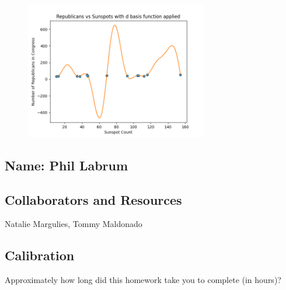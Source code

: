 \documentclass[submit]{harvardml}
\begin{document}
\begin{enumerate}
\begin{enumerate}
\begin{figure}[H]
            \includegraphics[width=8cm]{hw1/T1P4_plots/plot7.png}
            \centering
        \end{figure}
    \end{enumerate}

\end{enumerate}

\newpage
\subsection*{Name: Phil Labrum}

\subsection*{Collaborators and Resources}
Natalie Margulies, Tommy Maldonado

\subsection*{Calibration}
Approximately how long did this homework take you to complete (in hours)? 
\end{document}
